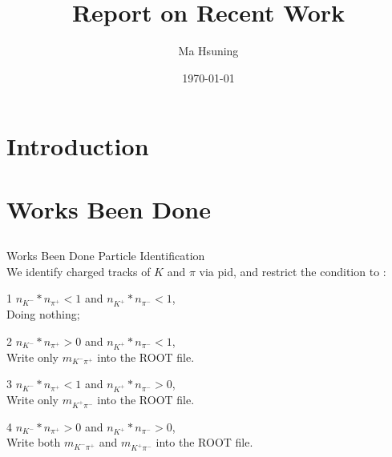 \documentclass{beamer}
\begin{document}
\title{Report on Recent Work}
\subtitle{}
\author{Ma Hsuning}
\date{\today}
\frame{\titlepage}

\section{Introduction}
\subsection{}

\section{Works Been Done}
\subsection{}

\begin{frame}{Works Been Done}
Particle Identification\\
			 \bigskip
We identify charged tracks of $K$ and $\pi$ via pid, and restrict the condition to :\\
	   \begin{itemized}
	   \item 1
	   $ n_{K^-} * n_{\pi ^+}<1 $ and $ n_{K^+}*n_{\pi^-}<1$,\\
		   Doing nothing;\\
	\item 2
	   $ n_{K^-} * n_{\pi ^+}>0 $ and $ n_{K^+}*n_{\pi^-}<1$,\\
		   Write only $m_{K^- \pi^+} $ into the ROOT file.
	\item 3
	   $ n_{K^-} * n_{\pi ^+}<1 $ and $ n_{K^+}*n_{\pi^-}>0$,\\
		   Write only $m_{K^+ \pi^-} $ into the ROOT file.
	\item 4
	   $ n_{K^-} * n_{\pi ^+}>0 $ and $ n_{K^+}*n_{\pi^-}>0$,\\
		   Write both $m_{K^- \pi^+} $ and $m_{K^+ \pi^-}$ into the ROOT file.
\end{itemized}
\end{frame}
\end{document}
